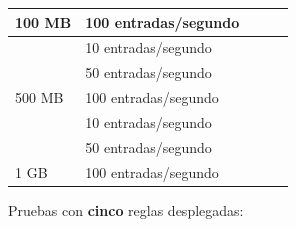 \begin{table}[H]
\begin{tabular}{|l|l|l|l|l|}
\multirow{-3}{*}{100 MB}                                 & 100 entradas/segundo                              &                                        &                                        &                                                 \\ \hline
                                                         & 10 entradas/segundo                               &                                        &                                        &                                                 \\ \cline{2-5} 
                                                         & 50 entradas/segundo                               &                                        &                                        &                                                 \\ \cline{2-5} 
\multirow{-3}{*}{500 MB}                                 & 100 entradas/segundo                              &                                        &                                        &                                                 \\ \hline
                                                         & 10 entradas/segundo                               &                                        &                                        &                                                 \\ \cline{2-5} 
                                                         & 50 entradas/segundo                               &                                        &                                        &                                                 \\ \cline{2-5} 
\multirow{-3}{*}{1 GB}                                   & 100 entradas/segundo                              &                                        &                                        &                                                 \\ \hline
\end{tabular}
\end{table}


Pruebas con \textbf{cinco} reglas desplegadas:

